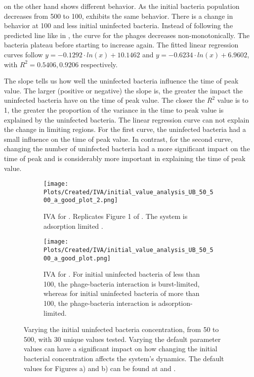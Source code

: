  on the other hand shows different behavior. 
As the initial bacteria population decreases from 500 to 100,  exhibits the same behavior. 
There is a change in behavior at 100 and less initial uninfected bacteria. 
Instead of following the predicted line like in , the curve for the phages decreases non-monotonically.
The bacteria plateau before starting to increase again. 
The fitted linear regression curves follow $y = -0.1292\cdot ln(x) + 10.1462$ and $y = -0.6234\cdot ln(x)+6.9602$, with $R^2=0.5406, 0.9206$ respectively. 

The slope tells us how well the uninfected bacteria influence the time of peak value. 
The larger (positive or negative) the slope is, the greater the impact the uninfected bacteria have on the time of peak value. 
The closer the $R^2$ value is to 1, the greater the proportion of the variance in the time to peak value is explained by the uninfected bacteria. 
The linear regression curve can not explain the change in limiting regions. 
For the first curve, the uninfected bacteria had a small influence on the time of peak value. 
In contrast, for the second curve, changing the number of uninfected bacteria had a more significant impact on the time of peak and is considerably more important in explaining the time of peak value. 

\begin{figure}
    \centering
    \begin{subfigure}{1\linewidth}
        \centering
        \texttt{[image: Plots/Created/IVA/initial\_value\_analysis\_UB\_50\_500\_a\_good\_plot\_2.png]}
        \caption{
            IVA for . 
            Replicates Figure 1 of \citet{mullaExtremeDiversityPhage2024}. 
            The system is adsorption limited \cite{mullaExtremeDiversityPhage2024}. 
        }
        \label{fig:created:initial_value_analysis_UB_50_500_a_good_plot_2}
    \end{subfigure}
    \hfill
    \begin{subfigure}{1\linewidth}
        \centering
        \texttt{[image: Plots/Created/IVA/initial\_value\_analysis\_UB\_50\_500\_a\_good\_plot.png]}
        \caption{
            IVA for . 
            For initial uninfected bacteria of less than 100, the phage-bacteria interaction is burst-limited, whereas for initial uninfected bacteria of more than 100, the phage-bacteria interaction is adsorption-limited. 
        }
        \label{fig:created:initial_value_analysis_UB_50_500_a_good_plot}
    \end{subfigure}
    \caption{
        Varying the initial uninfected bacteria concentration, from 50 to 500, with 30 unique values tested. 
        Varying the default parameter values can have a significant impact on how changing the initial bacterial concentration affects the system’s dynamics. 
        The default values for Figures a) and b) can be found at  and . 
    }
\end{figure}

